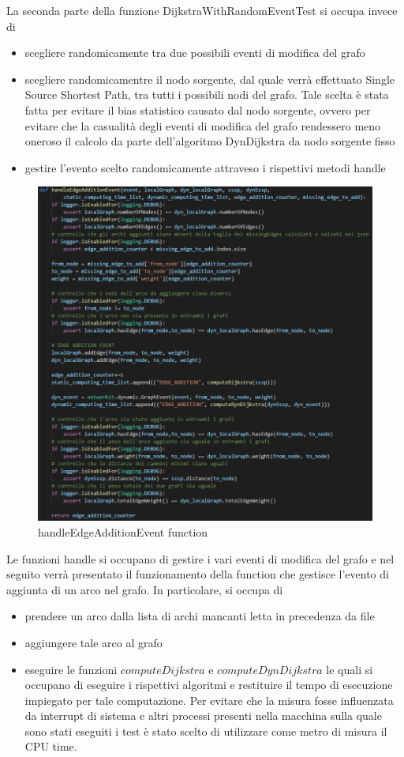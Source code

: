 \documentclass[a4paper]{article}
\begin{document}
La seconda parte della funzione DijkstraWithRandomEventTest si occupa invece di
\begin{itemize}
\item scegliere randomicamente tra due possibili eventi di modifica del grafo 
\item scegliere randomicamentre il nodo sorgente, dal quale verrà effettuato Single Source Shortest Path, tra tutti i possibili nodi del grafo. Tale scelta è stata fatta per evitare il bias statistico causato dal nodo sorgente, ovvero per evitare che la casualità degli eventi di modifica del grafo rendessero meno oneroso il calcolo da parte dell'algoritmo DynDijkstra da nodo sorgente fisso
\item gestire l'evento scelto randomicamente attraveso i rispettivi metodi handle
\end{itemize}
\newpage
\begin{figure}[!h]
\includegraphics[scale=0.52]{img/handleEdgeAdditionEvent}
\centering
\caption{handleEdgeAdditionEvent function}
\end{figure}
Le funzioni handle si occupano di gestire i vari eventi di modifica del grafo e nel seguito verrà presentato il funzionamento della function che gestisce l'evento di aggiunta di un arco nel grafo. In particolare, si occupa di
\begin{itemize}
\item prendere un arco dalla lista di archi mancanti letta in precedenza da file
\item aggiungere tale arco al grafo
\item eseguire le funzioni $computeDijkstra$ e $computeDynDijkstra$ le quali si occupano di 
eseguire i rispettivi algoritmi e restituire il tempo di esecuzione impiegato per tale computazione. Per evitare che la misura fosse influenzata da interrupt di sistema e altri processi presenti nella macchina sulla quale sono stati eseguiti i test è stato scelto di utilizzare come metro di misura il CPU time.
\end{itemize}
\end{document}
